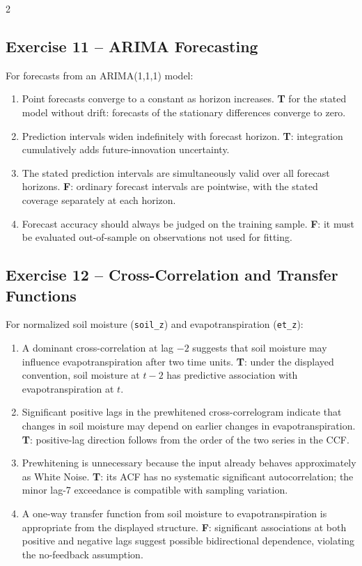 \documentclass[9pt,a4paper]{extarticle}
\begin{document}
\begin{multicols}{2}
\subsection*{Exercise 11 -- ARIMA Forecasting}
For forecasts from an ARIMA(1,1,1) model:
\begin{enumerate}[label=\alph*),leftmargin=4mm]
\item Point forecasts converge to a constant as horizon increases. \textbf{T} for the stated model without drift: forecasts of the stationary differences converge to zero.
\item Prediction intervals widen indefinitely with forecast horizon. \textbf{T}: integration cumulatively adds future-innovation uncertainty.
\item The stated prediction intervals are simultaneously valid over all forecast horizons. \textbf{F}: ordinary forecast intervals are pointwise, with the stated coverage separately at each horizon.
\item Forecast accuracy should always be judged on the training sample. \textbf{F}: it must be evaluated out-of-sample on observations not used for fitting.
\end{enumerate}

\subsection*{Exercise 12 -- Cross-Correlation and Transfer Functions}
For normalized soil moisture (\texttt{soil\_z}) and evapotranspiration (\texttt{et\_z}):
\begin{enumerate}[label=\alph*),leftmargin=4mm]
\item A dominant cross-correlation at lag \(-2\) suggests that soil moisture may influence evapotranspiration after two time units. \textbf{T}: under the displayed convention, soil moisture at \(t-2\) has predictive association with evapotranspiration at \(t\).
\item Significant positive lags in the prewhitened cross-correlogram indicate that changes in soil moisture may depend on earlier changes in evapotranspiration. \textbf{T}: positive-lag direction follows from the order of the two series in the CCF.
\item Prewhitening is unnecessary because the input already behaves approximately as White Noise. \textbf{T}: its ACF has no systematic significant autocorrelation; the minor lag-7 exceedance is compatible with sampling variation.
\item A one-way transfer function from soil moisture to evapotranspiration is appropriate from the displayed structure. \textbf{F}: significant associations at both positive and negative lags suggest possible bidirectional dependence, violating the no-feedback assumption.
\end{enumerate}


\end{multicols}
\end{document}
